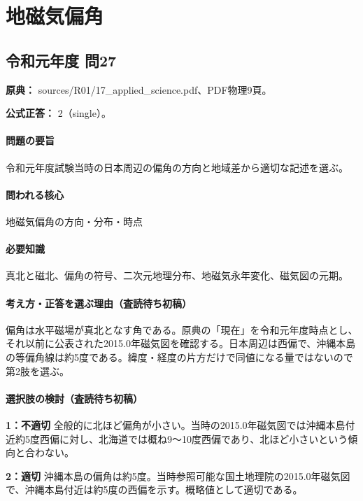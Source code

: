 \section{地磁気偏角}

\subsection{令和元年度 問27}
\label{q:r01-reg-applied-27}

\noindent\textbf{原典：} sources/R01/17\_applied\_science.pdf、PDF物理9頁。

\textbf{公式正答：} 2（single）。

\paragraph{問題の要旨} 令和元年度試験当時の日本周辺の偏角の方向と地域差から適切な記述を選ぶ。

\paragraph{問われる核心} 地磁気偏角の方向・分布・時点

\paragraph{必要知識} 真北と磁北、偏角の符号、二次元地理分布、地磁気永年変化、磁気図の元期。

\paragraph{考え方・正答を選ぶ理由（査読待ち初稿）} 偏角は水平磁場が真北となす角である。原典の「現在」を令和元年度時点とし、それ以前に公表された2015.0年磁気図を確認する。日本周辺は西偏で、沖縄本島の等偏角線は約5度である。緯度・経度の片方だけで同値になる量ではないので第2肢を選ぶ。

\paragraph{選択肢の検討（査読待ち初稿）}\mbox{}\par

\noindent\textbf{1：不適切} 全般的に北ほど偏角が小さい。当時の2015.0年磁気図では沖縄本島付近約5度西偏に対し、北海道では概ね9〜10度西偏であり、北ほど小さいという傾向と合わない。\par

\noindent\textbf{2：適切} 沖縄本島の偏角は約5度。当時参照可能な国土地理院の2015.0年磁気図で、沖縄本島付近は約5度の西偏を示す。概略値として適切である。\par

